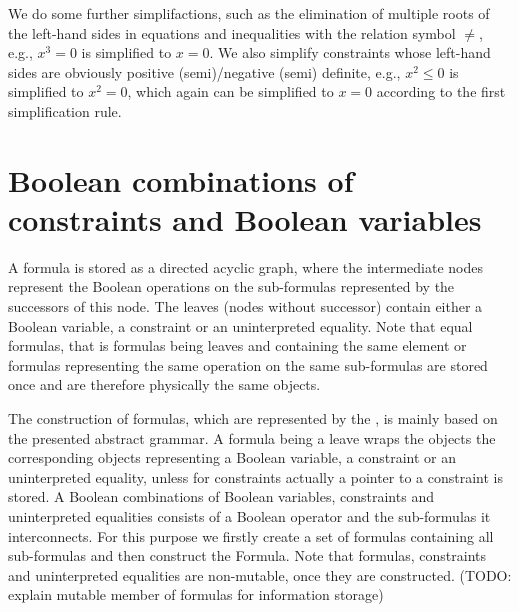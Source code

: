 We do some further simplifactions, such as the elimination of multiple roots of the left-hand sides in equations and inequalities with the relation symbol $\neq$, e.g., $x^3=0$ is simplified to $x=0$. We also simplify constraints whose left-hand sides are obviously positive (semi)/negative (semi) definite, e.g., $x^2\leq 0$ is simplified to $x^2=0$, which again can be simplified to $x=0$ according to the first simplification rule.

\section{Boolean combinations of constraints and Boolean variables}
A formula is stored as a directed acyclic graph, where the intermediate nodes represent the Boolean operations on the sub-formulas represented by the successors of this node. The leaves (nodes without successor) contain either a Boolean variable, a constraint or an uninterpreted equality. Note that equal formulas, that is formulas being leaves and containing the same element or formulas representing the same operation on the same sub-formulas are stored once and are therefore physically the same objects.

The construction of formulas, which are represented by the \formulaClass, is mainly based on the presented abstract grammar. A formula being a leave wraps the objects the corresponding objects representing a Boolean variable, a constraint or an uninterpreted equality, unless for constraints actually a pointer to a constraint is stored. A Boolean combinations of Boolean variables, constraints and uninterpreted equalities consists of a Boolean operator and the sub-formulas it interconnects. For this purpose we firstly create a set of formulas containing all sub-formulas and then construct the Formula. Note that formulas, constraints and uninterpreted equalities are non-mutable, once they are constructed. (TODO: explain mutable member of formulas for information storage) 

